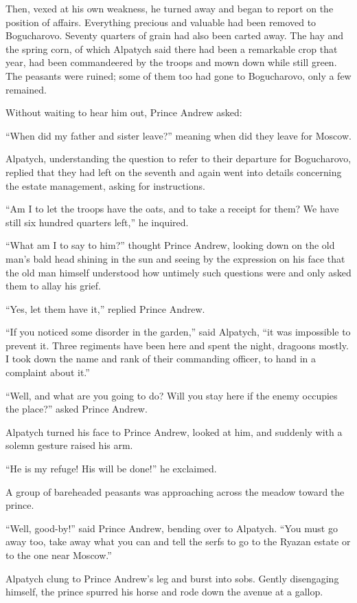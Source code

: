 Then, vexed at his own weakness, he turned away and began to
report on the position of affairs. Everything precious and
valuable had been removed to Bogucharovo. Seventy quarters of
grain had also been carted away. The hay and the spring corn, of
which Alpatych said there had been a remarkable crop that year,
had been commandeered by the troops and mown down while still
green. The peasants were ruined; some of them too had gone to
Bogucharovo, only a few remained.

Without waiting to hear him out, Prince Andrew asked:

``When did my father and sister leave?'' meaning when did they
leave for Moscow.

Alpatych, understanding the question to refer to their departure
for Bogucharovo, replied that they had left on the seventh and
again went into details concerning the estate management, asking
for instructions.

``Am I to let the troops have the oats, and to take a receipt for
them?  We have still six hundred quarters left,'' he inquired.

``What am I to say to him?'' thought Prince Andrew, looking down
on the old man's bald head shining in the sun and seeing by the
expression on his face that the old man himself understood how
untimely such questions were and only asked them to allay his
grief.

``Yes, let them have it,'' replied Prince Andrew.

``If you noticed some disorder in the garden,'' said Alpatych,
``it was impossible to prevent it. Three regiments have been here
and spent the night, dragoons mostly. I took down the name and
rank of their commanding officer, to hand in a complaint about
it.''

``Well, and what are you going to do? Will you stay here if the
enemy occupies the place?'' asked Prince Andrew.

Alpatych turned his face to Prince Andrew, looked at him, and
suddenly with a solemn gesture raised his arm.

``He is my refuge! His will be done!'' he exclaimed.

A group of bareheaded peasants was approaching across the meadow
toward the prince.

``Well, good-by!'' said Prince Andrew, bending over to
Alpatych. ``You must go away too, take away what you can and tell
the serfs to go to the Ryazan estate or to the one near Moscow.''

Alpatych clung to Prince Andrew's leg and burst into sobs. Gently
disengaging himself, the prince spurred his horse and rode down
the avenue at a gallop.


